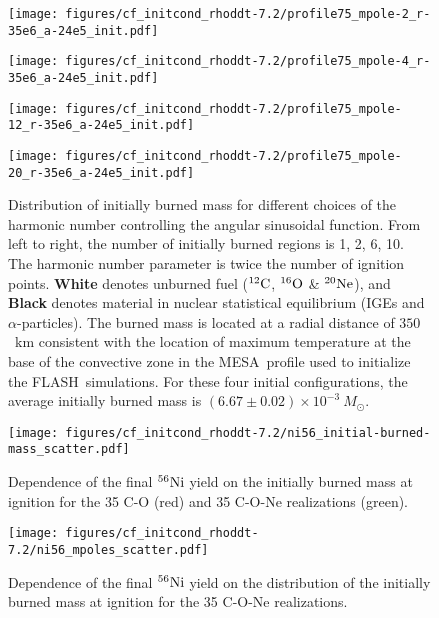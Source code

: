 \documentclass[iop,apj]{emulateapj}
\newcommand{\C}[1]{\ensuremath{{}^{#1}{\rm C}}}
\newcommand{\Ox}[1]{\ensuremath{{}^{#1}{\rm O}}}
\newcommand{\Ne}[1]{\ensuremath{{}^{#1}{\rm Ne}}}
\newcommand{\Ni}[1]{\ensuremath{{}^{#1}{\rm Ni}}}
\newcommand{\code}[1]{\textsc{#1}}
\newcommand{\FLASH}{\code{FLASH}}
\newcommand{\MESA}{\code{MESA}}
\newcommand{\Msun}{\ensuremath{M_\odot}}
\begin{document}
\begin{figure*}[ht]
  \begin{minipage}{0.24\textwidth}
    \texttt{[image: figures/cf\_initcond\_rhoddt-7.2/profile75\_mpole-2\_r-35e6\_a-24e5\_init.pdf]}
  \end{minipage} \hfill
  \begin{minipage}{0.24\textwidth}
    \texttt{[image: figures/cf\_initcond\_rhoddt-7.2/profile75\_mpole-4\_r-35e6\_a-24e5\_init.pdf]}
  \end{minipage} \hfill 
  \begin{minipage}{0.24\textwidth}
    \texttt{[image: figures/cf\_initcond\_rhoddt-7.2/profile75\_mpole-12\_r-35e6\_a-24e5\_init.pdf]}
  \end{minipage} \hfill 
  \begin{minipage}{0.24\textwidth}
    \texttt{[image: figures/cf\_initcond\_rhoddt-7.2/profile75\_mpole-20\_r-35e6\_a-24e5\_init.pdf]}
  \end{minipage} \caption{\label{fig:init_mpole_comparison}
    Distribution of initially burned mass for different choices of the
    harmonic number controlling the angular sinusoidal function. From
    left to right, the number of initially burned regions is 1, 2, 6,
    10. The harmonic number parameter is twice the number of ignition
    points. \textbf{White} denotes unburned fuel (\C{12}, \Ox{16} \&
    \Ne{20}), and \textbf{Black} denotes material in nuclear
    statistical equilibrium (IGEs and $\alpha$-particles). The burned
    mass is located at a radial distance of $350$~km consistent with
    the location of maximum temperature at the base of the convective
    zone in the \MESA\ profile used to initialize the
    \FLASH\ simulations. For these four initial configurations, the
    average initially burned mass is $(6.67 \pm 0.02) \times
    10^{-3}\ \Msun$.}
\end{figure*}

\begin{figure}[!ht]
	\texttt{[image: figures/cf\_initcond\_rhoddt-7.2/ni56\_initial-burned-mass\_scatter.pdf]}
	\caption{\label{fig:co_vs_cone_ignition_bm} Dependence of the
          final \Ni{56} yield on the initially burned mass at ignition
          for the 35 C-O (red) and 35 C-O-Ne realizations (green).}
\end{figure}

\begin{figure}[!ht]
	\texttt{[image: figures/cf\_initcond\_rhoddt-7.2/ni56\_mpoles\_scatter.pdf]}
	\caption{\label{fig:cone_ignition_mp} Dependence of the final
          \Ni{56} yield on the distribution of the initially burned
          mass at ignition for the 35 C-O-Ne realizations.}
\end{figure}
\end{document}
